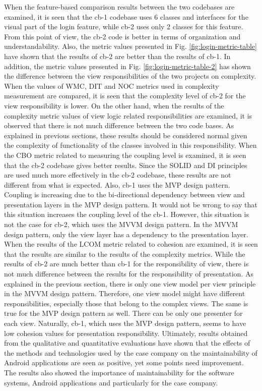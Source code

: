 When the feature-based comparison results between the two codebases are examined, it is seen that the cb-1 codebase uses 6 classes and interfaces for the visual part of the login feature, while cb-2 uses only 2 classes for this feature. From this point of view, the cb-2 code is better in terms of organization and understandability. Also, the metric values presented in Fig. \ref{fig:login-metric-table} have shown that the results of cb-2 are better than the results of cb-1. In addition, the metric values presented in Fig. \ref{fig:login-metric-table-2} has shown the difference between the view responsibilities of the two projects on complexity. When the values of WMC, DIT and NOC metrics used in complexity measurement are compared, it is seen that the complexity level of cb-2 for the view responsibility is lower. On the other hand, when the results of the complexity metric values of view logic related responsibilities are examined, it is observed that there is not much difference between the two code bases. As explained in previous sections, these results should be considered normal given the complexity of functionality of the classes involved in this responsibility. When the CBO metric related to measuring the coupling level is examined, it is seen that the cb-2 codebase gives better results. Since the SOLID and DI principles are used much more effectively in the cb-2 codebase, these results are not different from what is expected. Also, cb-1 uses the MVP design pattern. Coupling is increasing due to the bi-directional dependency between view and presentation layers in the MVP design pattern. It would not be wrong to say that this situation increases the coupling level of the cb-1. However, this situation is not the case for cb-2, which uses the MVVM design pattern. In the MVVM design pattern, only the view layer has a dependency to the presentation layer. When the results of the LCOM metric related to cohesion are examined, it is seen that the results are similar to the results of the complexity metrics. While the results of cb-2 are much better than cb-1 for the responsibility of view, there is not much difference between the results for the responsibility of presentation. As explained in the previous section, there is only one view model per view principle in the MVVM design pattern. Therefore, one view model might have different responsibilities, especially those that belong to the complex views. The same is true for the MVP design pattern as well. There can be only one presenter for each view. Naturally, cb-1, which uses the MVP design pattern, seems to have low cohesion values for presentation responsibility. Ultimately, results obtained from the qualitative and quantitative evaluations have shown that the effects of the methods and technologies used by the case company on the maintainability of Android applications are seen as positive, yet some points need improvement. The results also showed the importance of maintainability for the software systems, Android applications and particularly for the case company. 